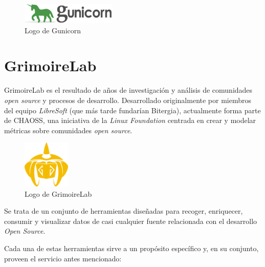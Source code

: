 \begin{figure}[ht]
    \centering
    \includegraphics[width=0.4\textwidth]{Figures/gunicorn-logo}
    \decoRule
    \caption[Gunicorn (Logo)]{Logo de Gunicorn \emph{\parencite{Reference10}}}
    \label{fig:gunicorn-logo}
\end{figure}


\section{GrimoireLab}\label{sec:grimoirelab}

GrimoireLab es el resultado de años de investigación y análisis de comunidades \emph{open source} y procesos de desarrollo. Desarrollado originalmente por miembros del equipo \emph{LibreSoft} (que más tarde fundarían Bitergia), actualmente forma parte de CHAOSS, una iniciativa de la \emph{Linux Foundation} centrada en crear y modelar métricas sobre comunidades \emph{open source}. \emph{\parencite{Reference12}}

\begin{figure}[ht]
    \centering
    \includegraphics[width=0.2\textwidth]{Figures/grimoirelab-logo}
    \decoRule
    \caption[GrimoireLab (Logo)]{Logo de GrimoireLab \emph{\parencite{Reference12}}}
    \label{fig:grimoirelab-logo}
\end{figure}

Se trata de un conjunto de herramientas diseñadas para recoger, enriquecer, consumir y visualizar datos de casi cualquier fuente relacionada con el desarrollo \emph{Open Source}.

Cada una de estas herramientas sirve a un propósito específico y, en su conjunto, proveen el servicio antes mencionado:

